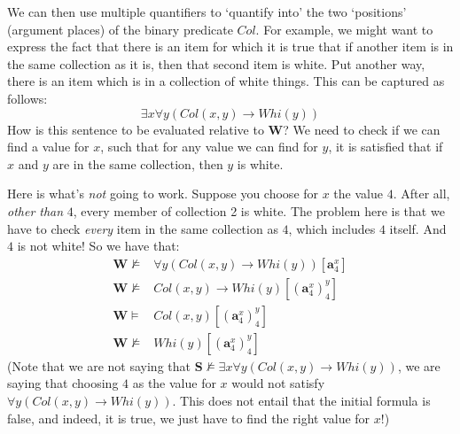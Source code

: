 
We can then use multiple quantifiers to `quantify into' the two `positions' (argument places) of the binary predicate $Col$. For example, we might want to express the fact that there is an item for which it is true that if another item is in the same collection as it is, then that second item is white. Put another way, there is an item which is in a collection of white things. This can be captured as follows:
\[
\exists x \forall y(Col(x, y) \rightarrow Whi(y))
\]
How is this sentence to be evaluated relative to $\mathbf{W}$? We need to check if we can find a value for $x$, such that for any value we can find for $y$, it is satisfied that if $x$ and $y$ are in the same collection, then $y$ is white. 

Here is what's \textit{not} going to work. Suppose you choose for $x$ the value $4$. After all, \textit{other than} $4$, every member of collection 2 is white. The problem here is that we have to check \textit{every} item in the same collection as $4$, which includes $4$ itself. And $4$ is not white! So we have that:
\begin{align*}
\mathbf{W} \not\models& \forall y(Col(x, y) \rightarrow Whi(y))[\mathbf{a}^x_4]\\
\mathbf{W} \not\models& Col(x, y) \rightarrow Whi(y)[(\mathbf{a}^x_4)^y_4]\\
\mathbf{W} \models& Col(x, y)[(\mathbf{a}^x_4)^y_4]\\
\mathbf{W} \not\models& Whi(y)[(\mathbf{a}^x_4)^y_4]
\end{align*} 
(Note that we are not saying that $\mathbf{S} \not\models \exists x \forall y(Col(x, y) \rightarrow Whi(y))$, we are saying that choosing $4$ as the value for $x$ would not satisfy $\forall y(Col(x, y) \rightarrow Whi(y))$. This does not entail that the initial formula is false, and indeed, it is true, we just have to find the right value for $x$!)

